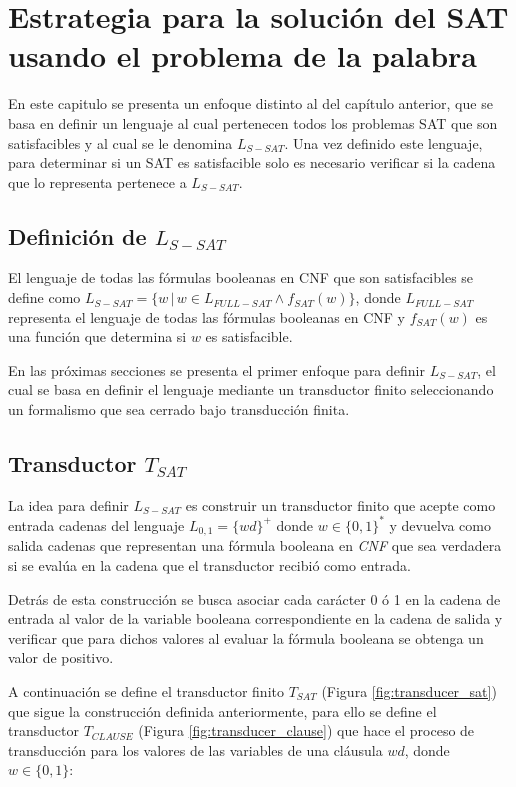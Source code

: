 \chapter{Estrategia para la solución del SAT usando el problema de la palabra}
\author{Raudel Alejandro Gómez Molina}

En este capitulo se presenta un enfoque distinto al del capítulo anterior, que se basa en definir un lenguaje al cual
pertenecen todos los problemas SAT que son satisfacibles y al cual se le denomina $L_{S-SAT}$. Una vez definido este lenguaje, para determinar
si un SAT es satisfacible solo es necesario verificar si la cadena que lo representa pertenece a $L_{S-SAT}$.

\section{Definición de $L_{S-SAT}$}

El lenguaje de todas las fórmulas booleanas en CNF que son satisfacibles se define como $L_{S-SAT}=\{w\,|\,w \in L_{FULL-SAT} \wedge f_{SAT}(w)\}$, 
donde $L_{FULL-SAT}$ representa el lenguaje de todas las fórmulas booleanas en CNF y $f_{SAT}(w)$ es una función que 
determina si $w$ es satisfacible.

En las próximas secciones se presenta el primer enfoque para definir $L_{S-SAT}$, el cual se basa en definir
el lenguaje mediante un transductor finito seleccionando un formalismo que sea cerrado bajo transducción finita.
\section{Transductor $T_{SAT}$}

La idea para definir $L_{S-SAT}$ es construir un transductor finito que acepte como entrada cadenas del lenguaje $L_{0,1}=\{wd\}^+$ donde $w\in \{0,1\}^*$
y devuelva como salida cadenas que representan una fórmula booleana en \textit{CNF} que sea verdadera si se evalúa en la cadena que el transductor recibió como entrada.

Detrás de esta construcción se busca asociar cada carácter 0 ó 1 en la cadena de entrada al valor de la variable booleana correspondiente 
en la cadena de salida y verificar que para dichos valores al evaluar la fórmula booleana se obtenga un valor de 
positivo.

A continuación se define el transductor finito $T_{SAT}$ (Figura \ref{fig:transducer_sat}) que sigue la construcción definida anteriormente, 
para ello se define el transductor $T_{CLAUSE}$ (Figura \ref{fig:transducer_clause}) que hace el proceso de transducción 
para los valores de las variables de una cláusula $wd$, donde $w\in \{0,1\}$:

